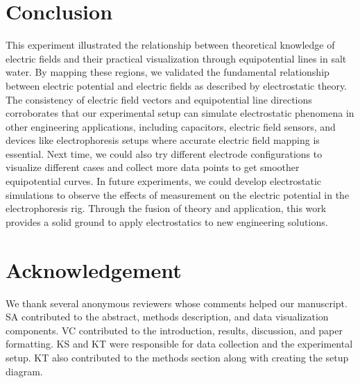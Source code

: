 \documentclass[10pt,journal,twoside]{IEEEtran}
\begin{document}
\section{Conclusion}
This experiment illustrated the relationship between theoretical knowledge of electric fields and their practical visualization through equipotential lines in salt water. By mapping these regions, we validated the fundamental relationship between electric potential and electric fields as described by electrostatic theory. The consistency of electric field vectors and equipotential line directions corroborates that our experimental setup can simulate electrostatic phenomena in other engineering applications, including capacitors, electric field sensors, and devices like electrophoresis setups where accurate electric field mapping is essential. Next time, we could also try different electrode configurations to visualize different cases and collect more data points to get smoother equipotential curves. In future experiments, we could develop electrostatic simulations to observe the effects of measurement on the electric potential in the electrophoresis rig. Through the fusion of theory and application, this work provides a solid ground to apply electrostatics to new engineering solutions.  






\section{Acknowledgement}
We thank several anonymous reviewers whose comments helped our manuscript.  SA contributed to the abstract, methods description, and data visualization components. VC contributed to the introduction, results, discussion, and paper formatting. KS and KT were responsible for data collection and the experimental setup. KT also contributed to the methods section along with creating the setup diagram. 
\end{document}
